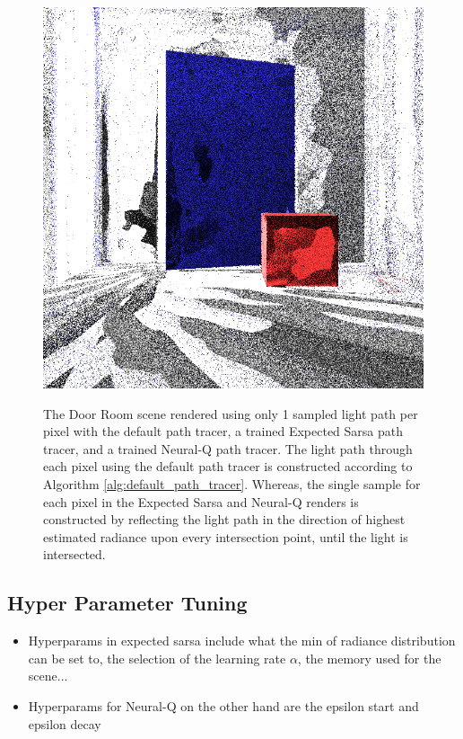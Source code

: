 \documentclass[../dissertation.tex]{subfiles}
\begin{document}
\begin{figure}[h]
  \label{fig:sarsa_1_spp}
\endminipage\hspace{0.1em}
  \includegraphics[width=\textwidth]{images/renders/max_dir/1_spp_nn_max_dir.png}
  \label{fig:neural_q_1_spp}
\endminipage
\caption{The Door Room scene rendered using only 1 sampled light path per pixel with the default path tracer, a trained Expected Sarsa path tracer, and a trained Neural-Q path tracer. The light path through each pixel using the default path tracer is constructed according to Algorithm \ref{alg:default_path_tracer}. Whereas, the single sample for each pixel in the Expected Sarsa and Neural-Q renders is constructed by reflecting the light path in the direction of highest estimated radiance upon every intersection point, until the light is intersected.}
\label{fig:1_spp_max_dir}
\end{figure}

\subsection{Hyper Parameter Tuning}
\begin{itemize}
\item Hyperparams in expected sarsa include what the min of radiance distribution can be set to, the selection of the learning rate $\alpha$, the memory used for the scene...
\item Hyperparams for Neural-Q on the other hand are the epsilon start and epsilon decay
\end{itemize}
\end{document}
